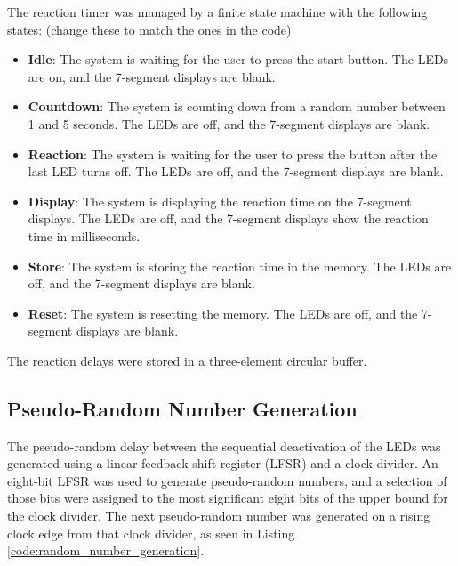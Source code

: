 \documentclass[12pt]{article}
\begin{document}
The reaction timer was managed by a finite state machine with the following states: (change these to match the ones in the code)
\begin{itemize}
    \item \textbf{Idle}: The system is waiting for the user to press the start button. The LEDs are on, and the 7-segment displays are blank.
    \item \textbf{Countdown}: The system is counting down from a random number between 1 and 5 seconds. The LEDs are off, and the 7-segment displays are blank.
    \item \textbf{Reaction}: The system is waiting for the user to press the button after the last LED turns off. The LEDs are off, and the 7-segment displays are blank.
    \item \textbf{Display}: The system is displaying the reaction time on the 7-segment displays. The LEDs are off, and the 7-segment displays show the reaction time in milliseconds.
    \item \textbf{Store}: The system is storing the reaction time in the memory. The LEDs are off, and the 7-segment displays are blank.
    \item \textbf{Reset}: The system is resetting the memory. The LEDs are off, and the 7-segment displays are blank.
\end{itemize}

The reaction delays were stored in a three-element circular buffer.

\subsection{Pseudo-Random Number Generation}

The pseudo-random delay between the sequential deactivation of the LEDs was generated using a linear feedback shift register (LFSR) and a clock divider. An eight-bit LFSR was used to generate pseudo-random numbers, and a selection of those bits were assigned to the most significant eight bits of the upper bound for the clock divider. The next pseudo-random number was generated on a rising clock edge from that clock divider, as seen in Listing \ref{code:random_number_generation}.
\end{document}

